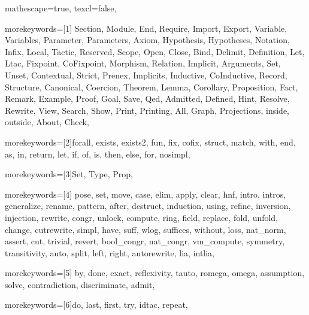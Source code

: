 
 {

mathescape=true,
texcl=false,


morekeywords=[1]{
Section, Module, End, Require, Import, Export,
Variable, Variables, Parameter, Parameters, Axiom, Hypothesis, Hypotheses,
Notation, Infix, Local, Tactic, Reserved, Scope, Open, Close, Bind, Delimit,
Definition, Let, Ltac, Fixpoint, CoFixpoint, Morphism, Relation,
Implicit, Arguments, Set, Unset, Contextual, Strict, Prenex, Implicits,
Inductive, CoInductive, Record, Structure, Canonical, Coercion,
Theorem, Lemma, Corollary, Proposition, Fact, Remark, Example,
Proof, Goal, Save, Qed, Admitted, Defined, Hint, Resolve, Rewrite, View,
Search, Show, Print, Printing, All, Graph, Projections,
inside, outside,
About, Check},


morekeywords=[2]{forall, exists, exists2, fun, fix, cofix, struct,
      match, with, end, as, in, return, let, if, of, is, then, else,
      for, nosimpl},

morekeywords=[3]{Set, Type, Prop},

morekeywords=[4]{
         pose, set, move, case, elim, apply, clear,
            hnf, intro, intros, generalize, rename, pattern, after,
            destruct, induction, using, refine, inversion, injection,
         rewrite, congr, unlock, compute, ring, field,
            replace, fold, unfold, change, cutrewrite, simpl,
         have, suff, wlog, suffices, without, loss, nat_norm,
            assert, cut, trivial, revert, bool_congr, nat_congr, vm_compute,
         symmetry, transitivity, auto, split, left, right,
         autorewrite, lia, intlia},

morekeywords=[5]{
         by, done, exact, reflexivity, tauto, romega, omega,
         assumption, solve, contradiction, discriminate, admit},


morekeywords=[6]{do, last, first, try, idtac, repeat},

}
